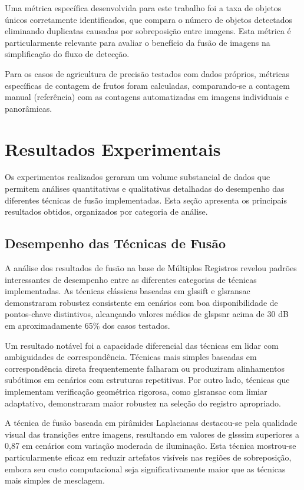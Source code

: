 Uma métrica específica desenvolvida para este trabalho foi a taxa de objetos únicos corretamente identificados, que compara o número de objetos detectados eliminando duplicatas causadas por sobreposição entre imagens. Esta métrica é particularmente relevante para avaliar o benefício da fusão de imagens na simplificação do fluxo de detecção.

Para os casos de agricultura de precisão testados com dados próprios, métricas específicas de contagem de frutos foram calculadas, comparando-se a contagem manual (referência) com as contagens automatizadas em imagens individuais e panorâmicas.

\section{Resultados Experimentais}

Os experimentos realizados geraram um volume substancial de dados que permitem análises quantitativas e qualitativas detalhadas do desempenho das diferentes técnicas de fusão implementadas. Esta seção apresenta os principais resultados obtidos, organizados por categoria de análise.

\subsection{Desempenho das Técnicas de Fusão}

A análise dos resultados de fusão na base de Múltiplos Registros revelou padrões interessantes de desempenho entre as diferentes categorias de técnicas implementadas. As técnicas clássicas baseadas em gls{sift} e gls{ransac} demonstraram robustez consistente em cenários com boa disponibilidade de pontos-chave distintivos, alcançando valores médios de gls{psnr} acima de 30 dB em aproximadamente 65\% dos casos testados.

Um resultado notável foi a capacidade diferencial das técnicas em lidar com ambiguidades de correspondência. Técnicas mais simples baseadas em correspondência direta frequentemente falharam ou produziram alinhamentos subótimos em cenários com estruturas repetitivas. Por outro lado, técnicas que implementam verificação geométrica rigorosa, como gls{ransac} com limiar adaptativo, demonstraram maior robustez na seleção do registro apropriado.

A técnica de fusão baseada em pirâmides Laplacianas destacou-se pela qualidade visual das transições entre imagens, resultando em valores de gls{ssim} superiores a 0,87 em cenários com variação moderada de iluminação. Esta técnica mostrou-se particularmente eficaz em reduzir artefatos visíveis nas regiões de sobreposição, embora seu custo computacional seja significativamente maior que as técnicas mais simples de mesclagem.

